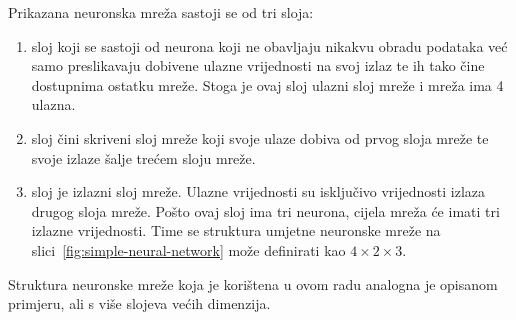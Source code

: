 Prikazana neuronska mreža sastoji se od tri sloja:
\begin{enumerate}
    \item sloj koji se sastoji od neurona koji ne obavljaju nikakvu obradu podataka već samo preslikavaju dobivene
    ulazne vrijednosti na svoj izlaz te ih tako čine dostupnima ostatku mreže. Stoga je ovaj sloj ulazni sloj mreže i
    mreža ima 4 ulazna.
    \item sloj čini skriveni sloj mreže koji svoje ulaze dobiva od prvog sloja mreže te svoje izlaze šalje trećem sloju
    mreže.
    \item sloj je izlazni sloj mreže. Ulazne vrijednosti su isključivo vrijednosti izlaza drugog sloja mreže. Pošto ovaj
    sloj ima tri neurona, cijela mreža će imati tri izlazne vrijednosti. Time se struktura umjetne neuronske mreže na
    slici\ \ref{fig:simple-neural-network} može definirati kao $4 \times 2 \times 3$.
\end{enumerate}
Struktura neuronske mreže koja je korištena u ovom radu analogna je opisanom primjeru, ali s više slojeva većih
dimenzija.


